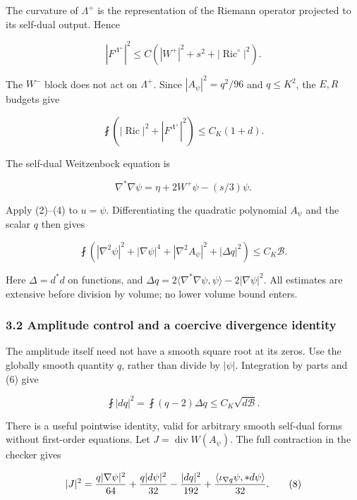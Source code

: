 \documentclass[
  10pt,
]{article}
\begin{document}
The curvature of \(\Lambda^+\) is the representation of the Riemann
operator projected to its self-dual output. Hence

\[
 |F^{\Lambda^+}|^2\le C\left(|W^+|^2+s^2+
                               |\operatorname{Ric}^{\circ}|^2\right).
                                                               \tag{5}
\]

The \(W^-\) block does not act on \(\Lambda^+\). Since
\(|A_\psi|^2=q^2/96\) and \(q\le K^2\), the \(E,R\) budgets give

\[
 \fint\left(|\operatorname{Ric}|^2+|F^{\Lambda^+}|^2\right)
 \le C_K(1+d).
\]

The self-dual Weitzenbock equation is

\[
 \nabla^*\nabla\psi=\eta+2W^+\psi-(s/3)\psi.
\]

Apply (2)--(4) to \(u=\psi\). Differentiating the quadratic polynomial
\(A_\psi\) and the scalar \(q\) then gives

\[
 \fint\left(|\nabla^2\psi|^2+|\nabla\psi|^4+
              |\nabla^2A_\psi|^2+|\Delta q|^2\right)
 \le C_K\mathcal B.
                                                               \tag{6}
\]

Here \(\Delta=d^*d\) on functions, and
\(\Delta q=2\langle\nabla^*\nabla\psi,\psi\rangle -2|\nabla\psi|^2\).
All estimates are extensive before division by volume; no lower volume
bound enters.

\hypertarget{amplitude-control-and-a-coercive-divergence-identity}{%
\subsubsection{3.2 Amplitude control and a coercive divergence
identity}\label{amplitude-control-and-a-coercive-divergence-identity}}

The amplitude itself need not have a smooth square root at its zeros.
Use the globally smooth quantity \(q\), rather than divide by
\(|\psi|\). Integration by parts and (6) give

\[
 \fint|dq|^2=\fint(q-2)\Delta q
                  \le C_K\sqrt{d\mathcal B}.             \tag{7}
\]

There is a useful pointwise identity, valid for arbitrary smooth
self-dual forms without first-order equations. Let
\(J=\operatorname{div}W(A_\psi)\). The full contraction in the checker
gives

\[
 |J|^2={q|\nabla\psi|^2\over64}+{q|d\psi|^2\over32}
       -{|dq|^2\over192}
       +{\langle\iota_{\nabla q}\psi,*d\psi\rangle\over32}.
                                                               \tag{8}
\]
\end{document}
